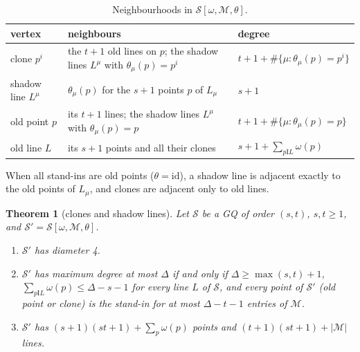 \documentclass[11pt]{amsart}
\newtheorem{theorem}{Theorem}[section]
\theoremstyle{definition}
\theoremstyle{remark}
\numberwithin{equation}{section}
\newcommand{\I}{\mathrel{\mathrm I}}
\newcommand{\cM}{\mathcal M}
\newcommand{\cS}{\mathcal S}
\begin{document}
\begin{table}[ht]
\caption{Neighbourhoods in $\cS[\omega,\cM,\theta]$.}\label{tab:clones}
\begin{tabular}{@{}l p{6.2cm} p{4.2cm}@{}}
\toprule vertex & neighbours & degree\\ \midrule
clone $p^i$ & the $t+1$ old lines on $p$; the shadow lines $L^\mu$ with $\theta_\mu(p)=p^i$ &
$t+1+\#\{\mu:\theta_\mu(p)=p^i\}$\\
shadow line $L^\mu$ & $\theta_\mu(p)$ for the $s+1$ points $p$ of $L_\mu$ & $s+1$\\
old point $p$ & its $t+1$ lines; the shadow lines $L^\mu$ with $\theta_\mu(p)=p$ & $t+1+\#\{\mu:\theta_\mu(p)=p\}$\\
old line $L$ & its $s+1$ points and all their clones & $s+1+\sum_{p\I L}\omega(p)$\\
\bottomrule
\end{tabular}
\end{table}

When all stand-ins are old points ($\theta=\mathrm{id}$), a shadow line is adjacent exactly to the old points of $L_\mu$,
and clones are adjacent only to old lines.

\begin{theorem}[clones and shadow lines]\label{thm:B}
Let $\cS$ be a GQ of order $(s,t)$, $s,t\ge1$, and $\cS'=\cS[\omega,\cM,\theta]$.
\begin{enumerate}[label=(\alph*)]
\item $\cS'$ has diameter 4.
\item $\cS'$ has maximum degree at most $\Delta$ if and only if $\Delta\ge\max(s,t)+1$, $\sum_{p\I L}\omega(p)\le\Delta-s-1$
  for every line $L$ of $\cS$, and every point of $\cS'$ (old point or clone) is the stand-in for at most $\Delta-t-1$
  entries of $\cM$.
\item $\cS'$ has $(s+1)(st+1)+\sum_p\omega(p)$ points and $(t+1)(st+1)+|\cM|$ lines.
\end{enumerate}
\end{theorem}
\end{document}
